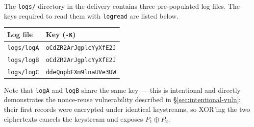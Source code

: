 \documentclass[a4paper, 12pt]{article}
\begin{document}
    The \texttt{logs/} directory in the delivery contains three pre-populated log files. The keys required to read them with \texttt{logread} are listed below.

    \begin{center}
    \begin{tabular}{ll}
        \toprule
        \textbf{Log file} & \textbf{Key (\texttt{-K})} \\
        \midrule
        \texttt{logs/logA} & \texttt{oCdZR2ArJgplcYyXfE2J} \\
        \texttt{logs/logB} & \texttt{oCdZR2ArJgplcYyXfE2J} \\
        \texttt{logs/logC} & \texttt{ddeQnpbEXm9lnaUVe3UW} \\
        \bottomrule
    \end{tabular}
    \end{center}

    Note that \texttt{logA} and \texttt{logB} share the same key --- this is intentional and directly demonstrates the nonce-reuse vulnerability described in \S\ref{sec:intentional-vuln}: their first records were encrypted under identical keystreams, so XOR'ing the two ciphertexts cancels the keystream and exposes $P_1 \oplus P_2$.
\end{document}
